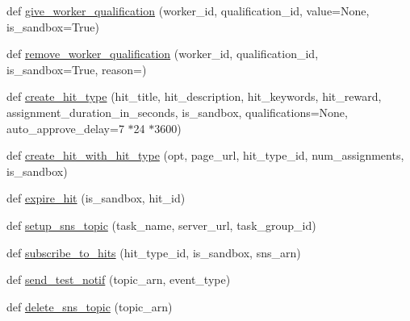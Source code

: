 \begin{DoxyCompactItemize}
\item 
def \hyperlink{namespaceparlai_1_1mturk_1_1core_1_1legacy__2018_1_1mturk__utils_aaaf07be966ed2720b918f8dd2775e18a}{give\+\_\+worker\+\_\+qualification} (worker\+\_\+id, qualification\+\_\+id, value=None, is\+\_\+sandbox=True)
\item 
def \hyperlink{namespaceparlai_1_1mturk_1_1core_1_1legacy__2018_1_1mturk__utils_aeb2a9fb74d8d0bbfe744bb6d89bee910}{remove\+\_\+worker\+\_\+qualification} (worker\+\_\+id, qualification\+\_\+id, is\+\_\+sandbox=True, reason=\textquotesingle{}\textquotesingle{})
\item 
def \hyperlink{namespaceparlai_1_1mturk_1_1core_1_1legacy__2018_1_1mturk__utils_a96dff775cc211227da667088e259c279}{create\+\_\+hit\+\_\+type} (hit\+\_\+title, hit\+\_\+description, hit\+\_\+keywords, hit\+\_\+reward, assignment\+\_\+duration\+\_\+in\+\_\+seconds, is\+\_\+sandbox, qualifications=None, auto\+\_\+approve\+\_\+delay=7 $\ast$24 $\ast$3600)
\item 
def \hyperlink{namespaceparlai_1_1mturk_1_1core_1_1legacy__2018_1_1mturk__utils_a98f3bb533401557bf8156d1b5b268df3}{create\+\_\+hit\+\_\+with\+\_\+hit\+\_\+type} (opt, page\+\_\+url, hit\+\_\+type\+\_\+id, num\+\_\+assignments, is\+\_\+sandbox)
\item 
def \hyperlink{namespaceparlai_1_1mturk_1_1core_1_1legacy__2018_1_1mturk__utils_a0b52e9d0397e0c856e76b3332987b930}{expire\+\_\+hit} (is\+\_\+sandbox, hit\+\_\+id)
\item 
def \hyperlink{namespaceparlai_1_1mturk_1_1core_1_1legacy__2018_1_1mturk__utils_ab542ba532f3609913b9b2ac465bf6e53}{setup\+\_\+sns\+\_\+topic} (task\+\_\+name, server\+\_\+url, task\+\_\+group\+\_\+id)
\item 
def \hyperlink{namespaceparlai_1_1mturk_1_1core_1_1legacy__2018_1_1mturk__utils_a157c3612c4df1187d8b8b5cfccbd339c}{subscribe\+\_\+to\+\_\+hits} (hit\+\_\+type\+\_\+id, is\+\_\+sandbox, sns\+\_\+arn)
\item 
def \hyperlink{namespaceparlai_1_1mturk_1_1core_1_1legacy__2018_1_1mturk__utils_a6567af08013cf893310b91b3e1a946e5}{send\+\_\+test\+\_\+notif} (topic\+\_\+arn, event\+\_\+type)
\item 
def \hyperlink{namespaceparlai_1_1mturk_1_1core_1_1legacy__2018_1_1mturk__utils_ac63e0052296484ca3430408e19327c54}{delete\+\_\+sns\+\_\+topic} (topic\+\_\+arn)
\end{DoxyCompactItemize}
